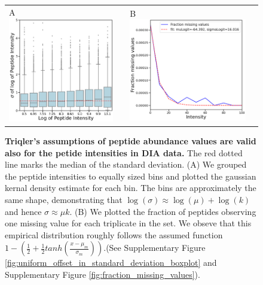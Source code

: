 \documentclass[10pt,letterpaper]{article}
\begin{document}
\begin{figure}[H]
    \centering
    \begin{tabular}{lclc} 
        A \includegraphics[width=0.40\linewidth]{../../result/report_plots/osw_sigma_mu_boxplot_qval_filtered_peptide_filtered_qbinned.png} & &%
        B \includegraphics[width=0.45\linewidth]{../../result/report_plots/osw_fraction_missing_values.png} & \\%

    \end{tabular}
        \caption{{\bf Triqler's assumptions of peptide abundance values are valid also for the petide intensities in DIA data.} The red dotted line marks the median of the standard deviation.  (A) We grouped the peptide intensities to equally sized bins and plotted the gaussian kernal density estimate for each bin. The bins are approximately the same shape, demonstrating that $\log(\sigma) \approx \log(\mu) + \log(k)$ and hence   $\sigma \approx \mu k$. (B) We plotted the fraction of peptides observing one missing value for each triplicate in the set. We obseve that this empirical distribution roughly follows the assumed function $1 - (\frac{1}{2} + \frac{1}{2}tanh(\frac{x - \mu_m}{\sigma_m}))$.(See Supplementary Figure \ref{fig:uniform_offset_in_standard_deviation_boxplot} and Supplementary Figure \ref{fig:fraction_missing_values}).}
      \label{fig:assumptions}
\end{figure}
\end{document}
